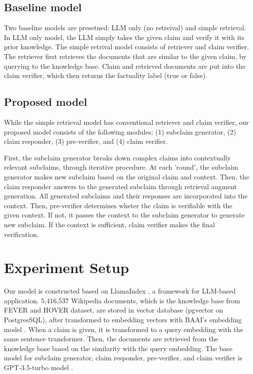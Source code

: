\documentclass{article}
\begin{document}
\subsection{Baseline model}\label{bs}
Two baseline models are presetned: LLM only (no retreival) and simple retrieval. In LLM only model, the LLM simply takes the given claim and verify it with its prior knowledge. The simple retrival model consists of retriever and claim verifier. The retriever first retrieves the documents that are similar to the given claim, by querying to the knowledge base. Claim and retrieved documents are put into the claim verifier, which then returns the factuality label (true or false).

\subsection{Proposed model}
While the simple retrieval model has conventional retriever and claim verifier, our proposed model consists of the following modules: (1) subclaim generator, (2) claim responder, (3) pre-verifier, and (4) claim verifier. \par
First, the subclaim generator breaks down complex claims into contextually relevant subclaims, through iterative procedure. At each 'round', the subclaim generator makes new subclaim based on the original claim and context.
Then, the claim responder answers to the generated subclaim through retrieval augment generation.
All generated subclaims and their responses are incorporated into the context.
Then, pre-verifier determines wheter the claim is verifiable with the given context. If not, it passes the context to the subclaim generator to generate new subclaim. 
If the context is sufficient, claim verifier makes the final verification.

\section{Experiment Setup}
Our model is constructed based on LlamaIndex \cite{LlamaIndex}, a framework for LLM-based application. 5,416,537 Wikipedia documents, which is the knowledge base from FEVER \cite{thorne2018fever} and HOVER \cite{jiang2020hover} dataset, are stored in vector database (pgvector on PostgresSQL), after transformed to embedding vectors with BAAI’s embedding model \cite{bge_embedding}. When a claim is given, it is transformed to a query embedding with the same sentence transformer. Then, the documents are retrieved from the knowledge base based on the similarity with the query embedding. The base model for subclaim generator, claim responder, pre-verifier, and claim verifier is GPT-3.5-turbo model \cite{gpt35}. 
\end{document}
